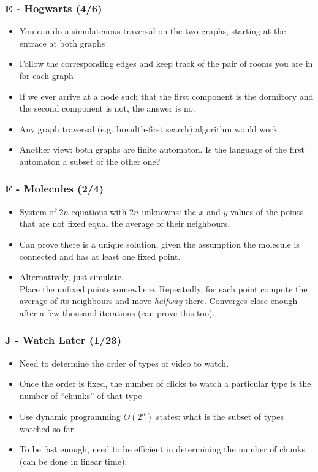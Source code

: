 \documentclass{beamer}
\begin{document}
\begin{frame}
\frametitle{E - Hogwarts (4/6)}
\begin{itemize}
  \setlength\itemsep{0.5\baselineskip}
\item You can do a simulatenous traversal on the two graphs, starting
  at the entrace at both graphs
\item Follow the corresponding edges and keep track of the pair of rooms
  you are in for each graph
\item If we ever arrive at a node such that the first component is the
  dormitory and the second component is not, the answer is no.
\item Any graph traversal (e.g. breadth-first search) algorithm would work.
\item Another view: both graphs are finite automaton.  Is the language of
  the first automaton a subset of the other one?
\end{itemize}
\end{frame}

\begin{frame}
\frametitle{F - Molecules (2/4)}
\begin{itemize}
\setlength\itemsep{0.5\baselineskip}
\item System of $2n$ equations with $2n$ unknowns: the $x$ and $y$ values of the points that are not fixed equal the average of their neighbours.
\item Can prove there is a unique solution, given the assumption the molecule is connected and has at least one fixed point.
\item Alternatively, just simulate.\\
Place the unfixed points somewhere. Repeatedly, for each point compute the average of its neighbours and move {\em halfway} there.
Converges close enough after a few thousand iterations (can prove this too).
\end{itemize}
\end{frame}

\begin{frame}
\frametitle{J - Watch Later (1/23)}
\begin{itemize}
  \setlength\itemsep{0.5\baselineskip}
\item Need to determine the order of types of video to watch.
\item Once the order is fixed, the number of clicks to watch a particular
  type is the number of ``chunks'' of that type
\item Use dynamic programming $O(2^n)$ states: what is the subset
  of types watched so far
\item To be fast enough, need to be efficient in determining the number
  of chunks (can be done in linear time).
\end{itemize}
\end{frame}
\end{document}
